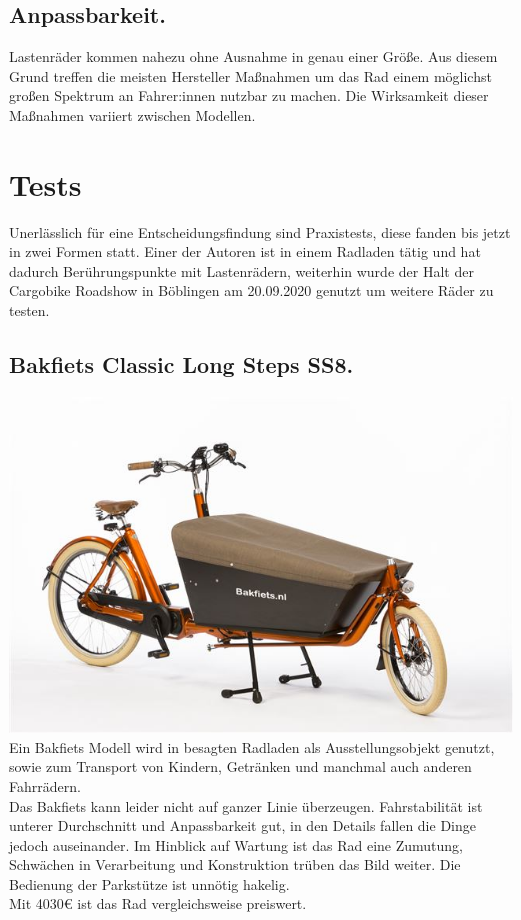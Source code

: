 \documentclass[a4paper,ngerman, 14pt] {scrartcl}
\begin{document}
\subsection{Anpassbarkeit.} Lastenräder kommen nahezu ohne Ausnahme in genau einer Größe. Aus diesem Grund treffen die meisten Hersteller Maßnahmen um das Rad einem möglichst großen Spektrum an Fahrer:innen nutzbar zu machen. Die Wirksamkeit dieser Maßnahmen variiert zwischen Modellen.
\newpage


\section{Tests}
Unerlässlich für eine Entscheidungsfindung sind Praxistests, diese fanden bis jetzt in zwei Formen statt. Einer der Autoren ist in einem Radladen tätig und hat dadurch Berührungspunkte mit Lastenrädern, weiterhin wurde der Halt der Cargobike Roadshow in Böblingen am 20.09.2020 genutzt um weitere Räder zu testen.

\subsection{Bakfiets Classic Long Steps SS8.}
\includegraphics[scale=0.8]{bakfiets_long_steps.jpg}\\
Ein Bakfiets Modell wird in besagten Radladen als Ausstellungsobjekt genutzt, sowie zum Transport von Kindern, Getränken und manchmal auch anderen Fahrrädern.\\
Das Bakfiets kann leider nicht auf ganzer Linie überzeugen. Fahrstabilität ist unterer Durchschnitt und Anpassbarkeit gut, in den Details fallen die Dinge jedoch auseinander. Im Hinblick auf Wartung ist das Rad eine Zumutung, Schwächen in Verarbeitung und Konstruktion trüben das Bild weiter. Die Bedienung der Parkstütze ist unnötig hakelig.\\ Mit 4030€ ist das Rad vergleichsweise preiswert.
\end{document}
